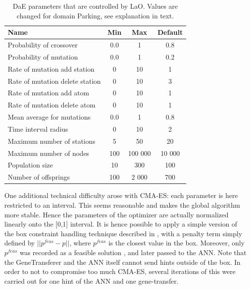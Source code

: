 \documentclass[runningheads,a4paper]{llncs}
\begin{document}
\begin{table}[ht]
\centering
\begin{tabular}{l c c c}
\hline\hline
Name & Min & Max & Default \\ 
\hline
Probability of crossover & 0.0 & 1 & 0.8 \\
Probability of mutation & 0.0& 1& 0.2 \\
Rate of mutation add station& 0& 10& 1 \\
Rate of mutation delete station& 0& 10& 3 \\
Rate of mutation add atom& 0& 10& 1 \\
Rate of mutation delete atom& 0& 10& 1 \\
Mean average for mutations& 0.0& 1& 0.8 \\
Time interval radius& 0& 10& 2 \\
Maximum number of stations& 5& 50& 20 \\
Maximum number of nodes& 100& 100 000& 10 000 \\
Population size& 10& 300& 100 \\
Number of offsprings & 100& 2 000& 700 \\
\hline
\end{tabular}
\caption{DaE parameters that are controlled by LaO. Values are changed for domain Parking, see explanation in text.}
\label{table:parameters}
\end{table} 


One additional technical difficulty arose with CMA-ES: each parameter is here restricted to an interval. This seems reasonable and makes the global algorithm more stable. Hence the parameters of the optimizer are actually normalized linearly onto the [0,1] interval. It is hence possible to apply a simple version of the box constraint handling technique described in \cite{hansen2009tec}, with a penalty term simply defined by \begin{math}||p^{feas}-p|| \end{math}, where \begin{math}p^{feas}\end{math} is the closest value in the box. Moreover, only \begin{math}p^{feas}\end{math} was recorded as a feasible solution , and later passed to the ANN. Note that the GeneTransferer and the ANN itself cannot send hints outside of the box. In order to not to compromise too much CMA-ES, several iterations of this were carried out for one hint of the ANN and one gene-transfer.
\end{document}
